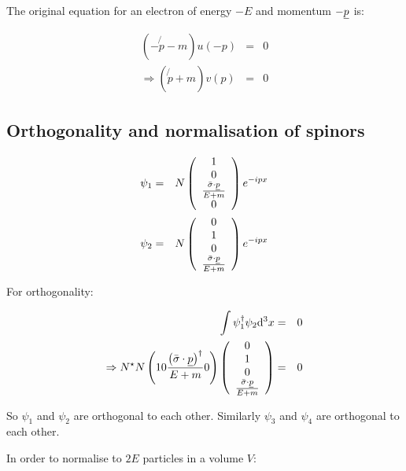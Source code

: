 The original equation for an electron of energy $-E$ and momentum $-\underline{p}$ is:

\begin{eqnarray*}
  \left(-\not{p} - m\right)u(-p) & = & 0 \\
  \Rightarrow \left(\not{p} + m\right)v(p) & = & 0
\end{eqnarray*}

\subsection{Orthogonality and normalisation of spinors}

\begin{eqnarray*}
  \psi_1 & = & N
  \left(
    \begin{array}{c}
    1 \\
    0 \\
    \frac{\bar{\sigma}\cdot\underline{p}}{E + m} \\
    0
    \end{array}
  \right)
  e^{-ipx}
  \\
  \psi_2 & = & N
  \left(
    \begin{array}{c}
    0 \\
    1 \\
    0 \\
    \frac{\bar{\sigma}\cdot\underline{p}}{E + m}
    \end{array}
  \right)
  e^{-ipx}
\end{eqnarray*}

For orthogonality:

\begin{eqnarray*}
  \int \psi_1^{\dagger}\psi_2\mathrm{d}^3x & = & 0 \\
  \Rightarrow N^{\star}N\left(1 0 \frac{\left(\bar{\sigma}\cdot\underline{p}\right)^{\dagger}}{E + m} 0\right)
  \left(
    \begin{array}{c}
    0 \\
    1 \\
    0 \\
    \frac{\bar{\sigma}\cdot\underline{p}}{E + m} 
    \end{array}
  \right)
  & = & 0
\end{eqnarray*}

So $\psi_1$ and $\psi_2$ are orthogonal to each other.  Similarly $\psi_3$ and $\psi_4$ are orthogonal to each other.

In order to normalise to $2E$ particles in a volume $V$:

